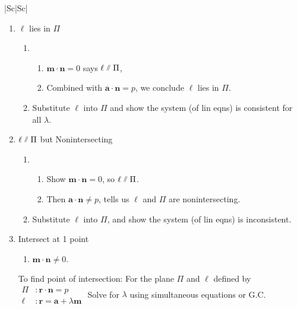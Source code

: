 \documentclass[oneside]{book}
\begin{document}
\begin{longtable}{|Sc|Sc|}
\begin{minipage}{0.5\textwidth}
  \begin{enumerate}
    \item \(\ell\) lies in \(\Pi\)
    \begin{enumerate}[label=M\arabic*:]
      \item
      \begin{enumerate}
        \item \(\mathbf{m}\cdot \mathbf{n}=0\) says \(\ell \newparallel \Pi\),
        \item Combined with \(\mathbf{a}\cdot \mathbf{n}=p\), we conclude \(\ell\) lies in \(\Pi\).
      \end{enumerate}
      \item Substitute \(\ell\) into \(\Pi\) and show the system (of lin eqns) is consistent for all \(\lambda\).
    \end{enumerate}
    \item \(\ell \newparallel \Pi\) but Nonintersecting
    \begin{enumerate}[label=M\arabic*:]
      \item 
      \begin{enumerate}
        \item Show \(\mathbf{m}\cdot \mathbf{n}=0\), so \(\ell \newparallel \Pi\).
        \item Then \(\mathbf{a}\cdot \mathbf{n} \neq p\), tells us \(\ell\) and \(\Pi\) are nonintersecting.
      \end{enumerate}
      \item Substitute \(\ell\) into \(\Pi\), and show the system (of lin eqns) is inconsistent.
    \end{enumerate} 
    \item Intersect at 1 point
    \begin{enumerate}[label=M\arabic*:]
      \item \(\mathbf{m}\cdot \mathbf{n} \neq 0\).
    \end{enumerate}
    To find point of intersection:
    For the plane \(\Pi\) and \(\ell\) defined by
    \(\begin{aligned}
      \Pi &\colon \mathbf{r}\cdot \mathbf{n}=p\\
      \ell &\colon \mathbf{r}=\mathbf{a}+\lambda \mathbf{m}
    \end{aligned}\)
    Solve for \(\lambda\) using simultaneous equations or G.C.
  \end{enumerate}
\end{minipage}\\

\end{longtable}
\end{document}
